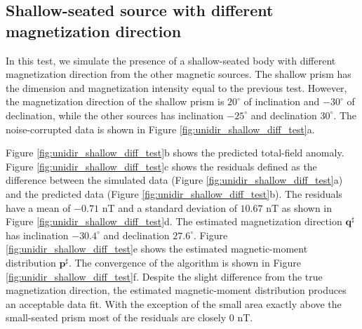 \subsection{Shallow-seated source with different magnetization direction}

In this test, we simulate the presence of a shallow-seated body with different magnetization direction from the other magnetic sources. The shallow prism has the dimension and magnetization intensity equal to the previous test. However, the magnetization direction of the shallow prism is $20^\circ$ of inclination and $-30^\circ$ of declination, while the other sources has inclination $-25^\circ$ and declination $30^\circ$. The noise-corrupted data is shown in Figure \ref{fig:unidir_shallow_diff_test}a.

Figure \ref{fig:unidir_shallow_diff_test}b shows the predicted total-field anomaly. Figure \ref{fig:unidir_shallow_diff_test}c shows the residuals defined as the difference between the simulated data (Figure \ref{fig:unidir_shallow_diff_test}a) and the predicted data (Figure \ref{fig:unidir_shallow_diff_test}b). The residuals have a mean of $-0.71$ nT and a standard deviation of $10.67$ nT as shown in Figure \ref{fig:unidir_shallow_diff_test}d. The estimated magnetization direction $\mathbf{q}^\sharp$ has inclination $-30.4^\circ$ and declination $27.6^\circ$. Figure \ref{fig:unidir_shallow_diff_test}e shows the estimated magnetic-moment distribution $\mathbf{p}^\sharp$. The convergence of the algorithm is shown in Figure \ref{fig:unidir_shallow_diff_test}f. Despite the slight difference from the true magnetization direction, the estimated magnetic-moment distribution produces an acceptable data fit. With the exception of the small area exactly above the small-seated prism most of the residuals are closely $0$ nT.  

